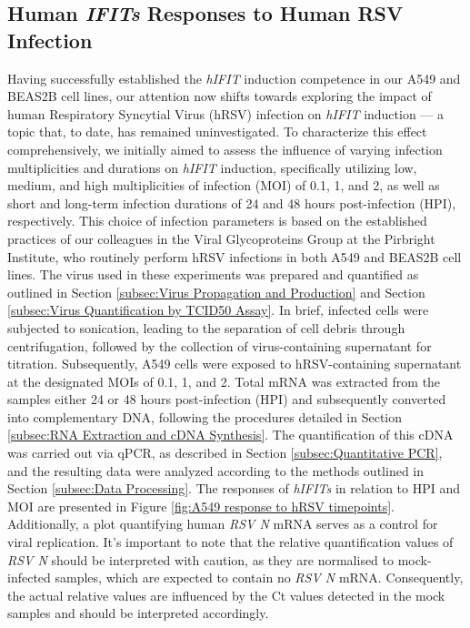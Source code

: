 \subsection{Human \textit{IFITs} Responses to Human RSV Infection} \label{subsec:Human IFITs Responses to Human RSV}
Having successfully established the \textit{hIFIT} induction competence in our A549 and BEAS2B cell lines, our attention now shifts towards exploring the impact of human Respiratory Syncytial Virus (hRSV) infection on \textit{hIFIT} induction — a topic that, to date, has remained uninvestigated. To characterize this effect comprehensively, we initially aimed to assess the influence of varying infection multiplicities and durations on \textit{hIFIT} induction, specifically utilizing low, medium, and high multiplicities of infection (MOI) of 0.1, 1, and 2, as well as short and long-term infection durations of 24 and 48 hours post-infection (HPI), respectively. This choice of infection parameters is based on the established practices of our colleagues in the Viral Glycoproteins Group at the Pirbright Institute, who routinely perform hRSV infections in both A549 and BEAS2B cell lines. The virus used in these experiments was prepared and quantified as outlined in Section \ref{subsec:Virus Propagation and Production} and Section \ref{subsec:Virus Quantification by TCID50 Assay}. In brief, infected cells were subjected to sonication, leading to the separation of cell debris through centrifugation, followed by the collection of virus-containing supernatant for titration. Subsequently, A549 cells were exposed to hRSV-containing supernatant at the designated MOIs of 0.1, 1, and 2. Total mRNA was extracted from the samples either 24 or 48 hours post-infection (HPI) and subsequently converted into complementary DNA, following the procedures detailed in Section \ref{subsec:RNA Extraction and cDNA Synthesis}. The quantification of this cDNA was carried out via qPCR, as described in Section \ref{subsec:Quantitative PCR}, and the resulting data were analyzed according to the methods outlined in Section \ref{subsec:Data Processing}. The responses of \textit{hIFITs} in relation to HPI and MOI are presented in Figure \ref{fig:A549 response to hRSV timepoints}. Additionally, a plot quantifying human \textit{RSV N} mRNA serves as a control for viral replication. It's important to note that the relative quantification values of \textit{RSV N} should be interpreted with caution, as they are normalised to mock-infected samples, which are expected to contain no \textit{RSV N} mRNA. Consequently, the actual relative values are influenced by the Ct values detected in the mock samples and should be interpreted accordingly.

